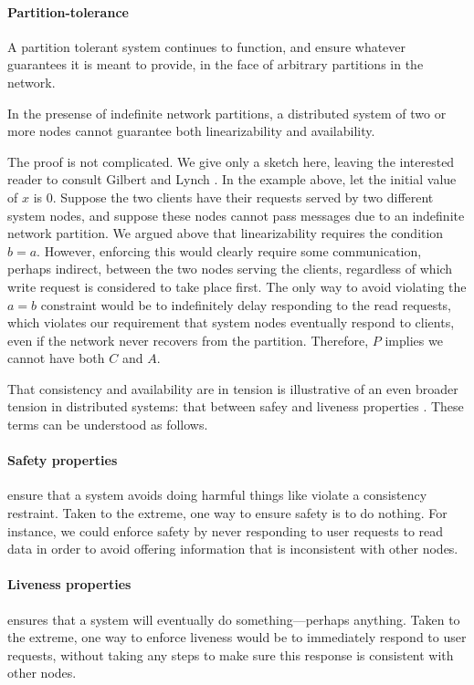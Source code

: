 \paragraph{Partition-tolerance}

A partition tolerant system continues to function, and ensure whatever
guarantees it is meant to provide, in the face of arbitrary partitions
in the network.

\begin{theorem}
In the presense of indefinite network partitions, a distributed system
of two or more nodes cannot guarantee both linearizability and
availability.
\end{theorem}

The proof is not complicated. We give only a sketch here, leaving the
interested reader to consult Gilbert and Lynch \cite{}. In the example
above, let the initial value of $x$ is $0$. Suppose the two clients
have their requests served by two different system nodes, and suppose
these nodes cannot pass messages due to an indefinite network
partition. We argued above that linearizability requires the condition
$b = a$.  However, enforcing this would clearly require some
communication, perhaps indirect, between the two nodes serving the
clients, regardless of which write request is considered to take place
first. The only way to avoid violating the $a = b$ constraint would be
to indefinitely delay responding to the read requests, which violates
our requirement that system nodes eventually respond to clients, even
if the network never recovers from the partition. Therefore, $P$
implies we cannot have both $C$ and $A$.

That consistency and availability are in tension is illustrative of an
even broader tension in distributed systems: that between safey and
liveness properties \cite{}. These terms can be understood as
follows.

\paragraph{Safety properties}
ensure that a system avoids doing harmful things like violate a
consistency restraint. Taken to the extreme, one way to ensure safety
is to do nothing. For instance, we could enforce safety by never
responding to user requests to read data in order to avoid offering
information that is inconsistent with other nodes.

\paragraph{Liveness properties}
ensures that a system will eventually do something---perhaps
anything. Taken to the extreme, one way to enforce liveness would be
to immediately respond to user requests, without taking any steps to
make sure this response is consistent with other nodes.

